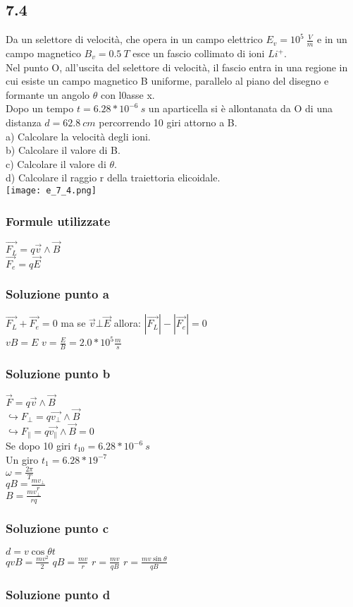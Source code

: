 \documentclass[../../main.tex]{subfiles}
\begin{document}
\subsection*{7.4}
Da un selettore di velocità, che opera in un campo elettrico $E_v = 10^5\ \frac{V}{m}$ e in un campo magnetico $B_v =0.5\ T$ esce un fascio collimato di ioni $Li^+$.
\\Nel punto O, all'uscita del selettore di velocità, il fascio entra in una regione in cui esiste un campo magnetico B uniforme, parallelo al piano del disegno e formante un angolo $\theta$ con l0asse x.
\\Dopo un tempo $t = 6.28 * 10^{-6}\ s$ un aparticella si è allontanata da O di una distanza $d = 62.8\ cm$ percorrendo 10 giri attorno a B.
\\a) Calcolare la velocità degli ioni.
\\b) Calcolare il valore di B.
\\c) Calcolare il valore di $\theta$.
\\d) Calcolare il raggio r della traiettoria elicoidale.
\\\texttt{[image: e\_7\_4.png]}
\subsubsection*{Formule utilizzate}
$\vec{F_L} = q\vec{v}\wedge\vec{B}$
\\$\vec{F_e} = q\vec{E}$
\subsubsection*{Soluzione punto a}
$\vec{F_L} + \vec{F_e} = 0$ ma se $\vec{v} \bot \vec{E}$ allora: $|\vec{F_L}| - |\vec{F_e}| = 0$
\\$vB = E$   $v= \frac{E}{B} = 2.0 * 10^5 \frac{m}{s}$
\subsubsection*{Soluzione punto b}
$\vec{F} = q\vec{v}\wedge\vec{B}$
\\$\hookrightarrow F_{\bot} = q\vec{v_{\bot}}\wedge\vec{B}$ 
\\$\hookrightarrow F_{\parallel} = q\vec{v_{\parallel}}\wedge\vec{B} = 0$
\\Se dopo 10 giri $t_10 = 6.28 * 10^{-6}\ s$
\\Un giro $t_1 = 6.28 * 19^{-7}$ 
\\$\omega = \frac{2\pi}{T}$
\\$qB = \frac{mv_\bot}{r}$
\\$B = \frac{mv_\bot}{rq}$
\subsubsection*{Soluzione punto c}
$d = v\cos\theta t$
\\$qvB = \frac{mv^2}{2}$   $qB = \frac{mv}{r}$   $r = \frac{mv}{qB}$   $r = \frac{mv\sin\theta}{qB}$
\subsubsection*{Soluzione punto d}
\newpage
\end{document}
